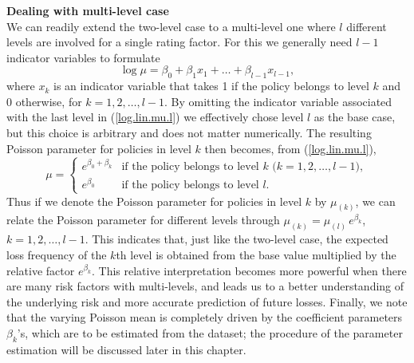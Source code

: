 \documentclass[12pt]{article}
\begin{document}
\noindent\textbf{Dealing with multi-level case\\}
We can readily extend the two-level case to a multi-level one where $l$ different levels are involved for a single rating factor. For this we generally need $l-1$ indicator variables to formulate
\begin{equation}
\label{log.lin.mu.l}
\log \mu=\beta_0+\beta_1 x_1+\ldots+\beta_{l-1} x_{l-1},
\end{equation} where $x_k$ is an indicator variable that takes 1 if the policy belongs to level $k$ and 0 otherwise, for $k=1,2, \ldots, l-1$. By omitting the indicator variable associated with the last level in (\ref{log.lin.mu.l}) we effectively chose level $l$ as the base case, but this choice is arbitrary and does not matter numerically.  The resulting Poisson parameter for policies in level $k$ then becomes, from (\ref{log.lin.mu.l}),
\begin{equation}
\label{ind.mu.l} \nonumber
\mu= \begin{cases}
     e^{\beta_0+\beta_k} & \text{if the policy belongs to level $k$ ($k=1,2, \ldots, l-1$)}, \\
     e^{\beta_0} & \text{if the policy belongs to level $l$}.
\end{cases}
\end{equation}
Thus if we denote the Poisson parameter for policies in level $k$ by $\mu_{(k)}$, we can relate the Poisson parameter for different levels through $\mu_{(k)}=\mu_{(l)}\, e^{\beta_k}$, $k=1,2, \ldots, l-1$. This indicates that, just like the two-level case, the expected loss frequency of the $k$th level is obtained from the base value multiplied by the relative factor $e^{\beta_k}$. 
This relative interpretation becomes more powerful when there are many risk factors with multi-levels, and leads us to a better understanding  of the underlying risk and more accurate prediction of future losses. Finally, we note that the varying Poisson mean is completely driven by the coefficient parameters $\beta_k$'s, which are to be estimated from the dataset; the procedure of the parameter estimation will be discussed later in this chapter.
%
%
\end{document}
